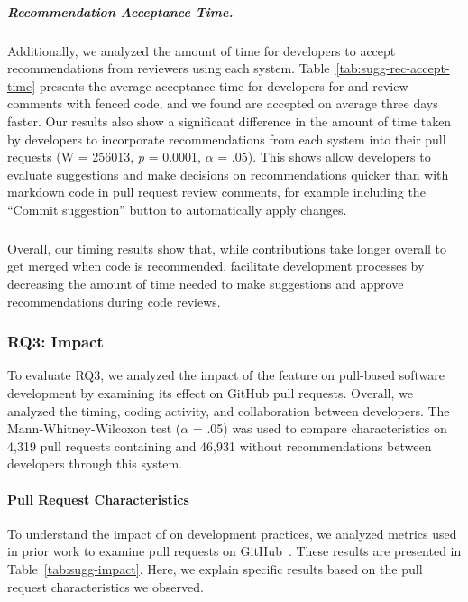 \subparagraph{Recommendation Acceptance Time.}

Additionally, we analyzed the amount of time for developers to accept recommendations from reviewers using each system. Table~\ref{tab:sugg-rec-accept-time} presents the average acceptance time for developers for \suggs and review comments with fenced code, and we found \sugg are accepted on average three days faster. Our results also show a significant difference in the amount of time taken by developers to incorporate recommendations from each system into their pull requests (W = 256013, \textit{p} = 0.0001, $\alpha$ = .05). This shows \suggs allow developers to evaluate suggestions and make decisions on recommendations quicker than with markdown code in pull request review comments, for example including the ``Commit suggestion'' button to automatically apply changes. 

\subparagraph{} Overall, our timing results show that, while contributions take longer overall to get merged when code is recommended, \sugg facilitate development processes by decreasing the amount of time needed to make suggestions and approve recommendations during code reviews.



\subsubsection{RQ3: Impact}


To evaluate RQ3, we analyzed the impact of the \sugg feature on pull-based software development by examining its effect on GitHub pull requests. Overall, we analyzed the timing, coding activity, and collaboration between developers. The Mann-Whitney-Wilcoxon test ($\alpha$ = .05) was used to compare characteristics on 4,319 pull requests containing \suggs and 46,931 without recommendations between developers through this system.

\paragraph*{Pull Request Characteristics}

To understand the impact of \sugg on development practices, we analyzed metrics used in prior work to examine pull requests on GitHub~\cite{gousios2014dataset}. These results are presented in Table~\ref{tab:sugg-impact}. Here, we explain specific results based on the pull request characteristics we observed.

